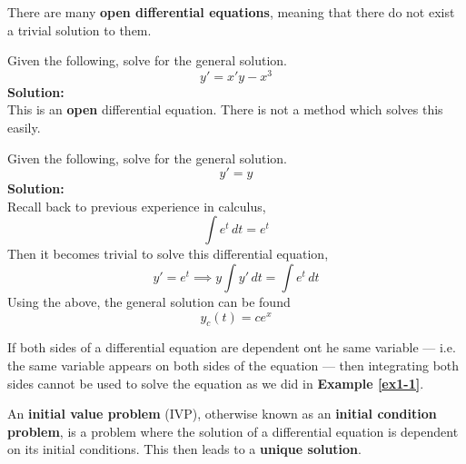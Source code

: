 \documentclass[diffeq.tex]{subfiles}
\begin{document}
    \begin{definition}
        There are many \textbf{open differential equations}, meaning that there do not exist a trivial solution to them.
    \end{definition}
    \begin{example}
        Given the following, solve for the general solution.
        \begin{equation}
            y' = x'y - x^{3}
        \end{equation}
        \textbf{Solution:}\\
        This is an \textbf{open} differential equation. There is not a method which solves this easily.
    \end{example}
    \begin{example}
        \label{ex1-3}
        Given the following, solve for the general solution.
        \begin{equation}
            y' = y
        \end{equation}
        \textbf{Solution:}\\
        Recall back to previous experience in calculus,
        \begin{equation}
            \int e^{t}\,dt = e^{t}
        \end{equation}
        Then it becomes trivial to solve this differential equation,
        \begin{equation}
            y' = e^t \implies y \int y'\,dt = \int e^t\,dt
        \end{equation}
        Using the above, the general solution can be found
        \begin{equation}
            y_c(t) = ce^{x}
        \end{equation}
    \end{example}
    \np
    \begin{remark}
        If both sides of a differential equation are dependent ont he same variable --- i.e. the same variable appears on both sides of the equation --- then integrating both sides cannot be used to solve the equation as we did in \textbf{Example \ref{ex1-1}}.
    \end{remark}
    \begin{definition}
        An \textbf{initial value problem} (IVP), otherwise known as an \textbf{initial condition problem}, is a problem where the solution of a differential equation is dependent on its initial conditions. This then leads to a \textbf{unique solution}.
    \end{definition}
\end{document}
